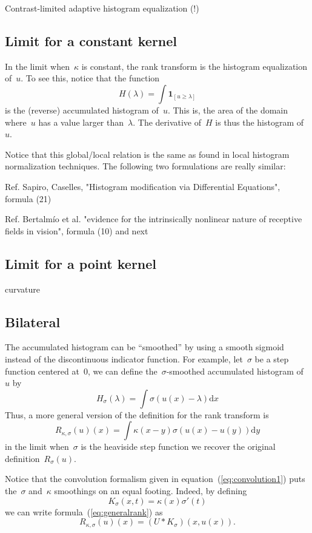 \documentclass[12pt]{article}                  %
\begin{document}
Contrast-limited adaptive histogram equalization (!)

\subsection{Limit for a constant kernel}

In the limit when~$\kappa$ is constant, the rank transform is the histogram
equalization of~$u$.  To see this, notice that the function
\[
H(\lambda) = \int\mathbf{1}_{[u\ge\lambda]}
\]
is the (reverse) accumulated histogram of~$u$.  This is, the area of the domain
where~$u$ has a value larger than~$\lambda$.  The derivative of~$H$ is thus the
histogram of~$u$.

Notice that this global/local relation is the same as found in local
histogram normalization techniques.
The following two formulations are really similar:

Ref. Sapiro, Caselles,  "Histogram modification via Differential Equations",
formula (21)~\cite{sapiro1997histogram}

Ref. Bertalmío et al. "evidence for the intrinsically nonlinear nature of
receptive fields in vision", formula (10) and next~\cite{bertalmio2020evidence}

\subsection{Limit for a point kernel}

curvature


\subsection{Bilateral}
The accumulated histogram can be ``smoothed'' by using a smooth sigmoid instead
of the discontinuous indicator function.  For example, let~$\sigma$ be a step
function centered at~$0$, we can define the~$\sigma$-smoothed accumulated
histogram of~$u$ by
\[
H_\sigma(\lambda)=\int\sigma(u(x)-\lambda)\mathrm{d}x
\]
Thus, a more general version of the definition for the rank transform is
\begin{equation}\label{eq:generalrank}
R_{\kappa,\sigma}(u)(x)=\int \kappa(x-y)\sigma(u(x)-u(y))\mathrm{d}y
\end{equation}
in the limit when~$\sigma$ is the heaviside step function we recover the
original definition~$R_\sigma(u)$.

Notice that the convolution formalism given in
equation~(\ref{eq:convolution1}) puts the~$\sigma$ and~$\kappa$ smoothings
on an equal footing.  Indeed, by defining
\[
	K_\sigma(x,t)=\kappa(x)\sigma'(t)
\]
we can write formula~(\ref{eq:generalrank}) as
\begin{equation}\label{eq:convolution2}
	R_{\kappa,\sigma}(u)(x)=(U*K_\sigma)(x,u(x)).
\end{equation}
\end{document}
